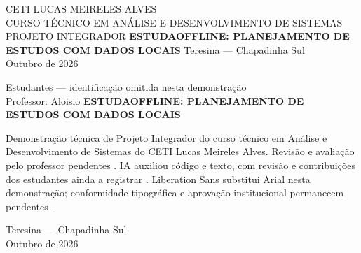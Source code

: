 \documentclass[12pt,a4paper]{article}
\begin{document}
\sloppy
\begin{titlepage}\centering CETI LUCAS MEIRELES ALVES\\CURSO TÉCNICO EM ANÁLISE E DESENVOLVIMENTO DE SISTEMAS\\PROJETO INTEGRADOR\vfill
{\Large\bfseries ESTUDAOFFLINE: PLANEJAMENTO DE ESTUDOS COM DADOS LOCAIS}\vfill
Teresina — Chapadinha Sul\\Outubro de 2026\end{titlepage}
\begin{titlepage}\centering Estudantes — identificação omitida nesta demonstração\\Professor: Aloisio\vfill
{\Large\bfseries ESTUDAOFFLINE: PLANEJAMENTO DE ESTUDOS COM DADOS LOCAIS}\vspace{2cm}
\begin{flushright}\begin{minipage}{.6\textwidth}Demonstração técnica de Projeto Integrador do curso técnico em Análise e Desenvolvimento de Sistemas do CETI Lucas Meireles Alves. Revisão e avaliação pelo professor pendentes . IA auxiliou código e texto, com revisão e contribuições dos estudantes ainda a registrar . Liberation Sans substitui Arial nesta demonstração; conformidade tipográfica e aprovação institucional permanecem pendentes .\end{minipage}\end{flushright}\vfill Teresina — Chapadinha Sul\\Outubro de 2026\end{titlepage}
\renewcommand{\contentsname}{Sumário}\tableofcontents\newpage


\end{document}
